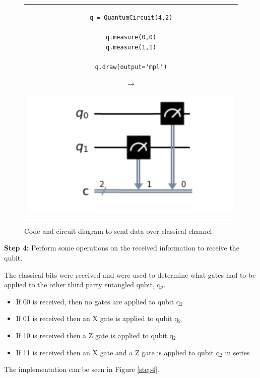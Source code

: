 \begin{figure}[H]
\centering
\begin{tabular}{c}
\begin{minipage}[c]{.45\linewidth}
\begin{verbatim}
q = QuantumCircuit(4,2)

q.measure(0,0)
q.measure(1,1)

q.draw(output='mpl')
\end{verbatim}
\end{minipage}
\begin{minipage}[c]{.1\linewidth}
\centering
$\rightarrow$
\end{minipage}
\begin{minipage}[c]{.4\linewidth}
\centering
\includegraphics[width=\textwidth]{lab3/images/Step3.png}
\end{minipage}\\
\\ 
\end{tabular}
\caption{Code and circuit diagram to send data over classical channel}
\label{step3}
\end{figure}

\textbf{Step 4:} Perform some operations on the received information to receive the qubit.

The classical bits were received and were used to determine what gates had to be applied to the other third party entangled qubit, q$_2$. 
\begin{itemize}
    \item If 00 is received, then no gates are applied to qubit q$_2$
    \item If 01 is received then an X gate is applied to qubit q$_2$
    \item If 10 is received then a Z gate is applied to qubit q$_2$
    \item If 11 is received then an X gate and a Z gate is applied to qubit q$_2$ in series
\end{itemize}
The implementation can be seen in Figure \ref{step4}.

